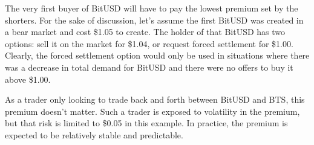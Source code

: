 The very first buyer of BitUSD will have to pay the lowest premium set by the
shorters. For the sake of discussion, let's assume the first BitUSD was created
in a bear market and cost \$1.05 to create. The holder of that BitUSD has two
options: sell it on the market for \$1.04, or request forced settlement for
\$1.00. Clearly, the forced settlement option would only be used in situations
where there was a decrease in total demand for BitUSD and there were no offers
to buy it above \$1.00.

As a trader only looking to trade back and forth between BitUSD and BTS, this
premium doesn't matter. Such a trader is exposed to volatility in the premium,
but that risk is limited to \$0.05 in this example. In practice, the premium is
expected to be relatively stable and predictable.

